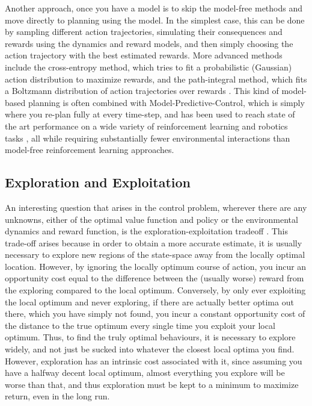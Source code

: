 Another approach, once you have a model is to skip the model-free methods and move directly to planning using the model. In the simplest case, this can be done by sampling different action trajectories, simulating their consequences and rewards using the dynamics and reward models, and then simply choosing the action trajectory with the best estimated rewards. More advanced methods include the cross-entropy method, which tries to fit a probabilistic (Gaussian) action distribution to maximize rewards, and the path-integral method, which fits a Boltzmann distribution of action trajectories over rewards \citep{kappen2012optimal,rawlik2013probabilistic,theodorou2010reinforcement,williams2017model,williams2018predictive}. This kind of model-based planning is often combined with Model-Predictive-Control, which is simply where you re-plan fully at every time-step, and has been used to reach state of the art performance on a wide variety of reinforcement learning \citep{nagabandi2019deep} and robotics tasks \citep{williams2016aggressive,williams2017information}, all while requiring substantially fewer environmental interactions than model-free reinforcement learning approaches.

\subsection{Exploration and Exploitation}

An interesting question that arises in the control problem, wherever there are any unknowns, either of the optimal value function and policy or the environmental dynamics and reward function, is the exploration-exploitation tradeoff \citep{cohen2007should,dayan2008decision,sutton1998introduction,kaelbling1998planning,mobbs2018foraging,berger2014exploration}. This trade-off arises because in order to obtain a more accurate estimate, it is usually necessary to explore new regions of the state-space away from the locally optimal location. However, by ignoring the locally optimum course of action, you incur an opportunity cost equal to the difference between the (usually worse) reward from the exploring compared to the local optimum. Conversely, by only ever exploiting the local optimum and never exploring, if there are actually better optima out there, which you have simply not found, you incur a constant opportunity cost of the distance to the true optimum every single time you exploit your local optimum. Thus, to find the truly optimal behaviours, it is necessary to explore widely, and not just be sucked into whatever the closest local optima you find. However, exploration has an intrinsic cost associated with it, since assuming you have a halfway decent local optimum, almost everything you explore will be worse than that, and thus exploration must be kept to a minimum to maximize return, even in the long run.

